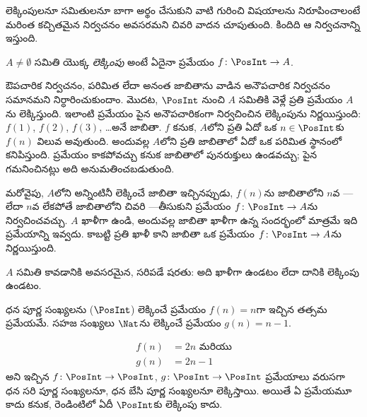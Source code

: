 \documentclass[../../../include/open-logic-section]{subfiles}
\begin{document}
లెక్కింపులనూ  సమితులనూ బాగా అర్థం చేసుకుని వాటి గురించి
విషయాలను నిరూపించాలంటే మరింత కచ్చితమైన నిర్వచనం అవసరమని చివరి వాదన
చూపుతుంది. కిందిది ఆ నిర్వచనాన్ని ఇస్తుంది.

\begin{defn}[లెక్కింపు: ఔపచారికంగా]
$A \neq \emptyset$ సమితి యొక్క \emph{లెక్కింపు} అంటే ఏదైనా
 ప్రమేయం $f \colon \PosInt \to A$.
\end{defn}

\begin{explain}
ఔపచారిక నిర్వచనం, పరిమిత లేదా అనంత జాబితాను వాడిన అనౌపచారిక
నిర్వచనం సమానమని నిర్ధారించుకుందాం. మొదట, $\PosInt$ నుంచి $A$
సమితికి వెళ్లే ప్రతి  ప్రమేయం $A$ను లెక్కిస్తుంది.
ఇలాంటి ప్రమేయం పైన అనౌపచారికంగా నిర్వచించిన లెక్కింపును నిర్ణయిస్తుంది:
$f(1)$, $f(2)$, $f(3)$, \dots అనే జాబితా. $f$  కనుక,
$A$లోని ప్రతి  ఏదో ఒక $n \in \PosInt$కు $f(n)$ విలువ
అవుతుంది. అందువల్ల $A$లోని ప్రతి  జాబితాలో ఏదో ఒక పరిమిత
స్థానంలో కనిపిస్తుంది. ప్రమేయం  కాకపోవచ్చు కనుక జాబితాలో
పునరుక్తులు ఉండవచ్చు; పైన గమనించినట్లు అది అనుమతించబడుతుంది.

మరోవైపు, $A$లోని  అన్నింటినీ లెక్కించే జాబితా ఇచ్చినప్పుడు,
$f(n)$ను జాబితాలోని $n$వ ---లేదా $n$వ  లేకపోతే
జాబితాలోని చివరి ---తీసుకుని  ప్రమేయం
$f\colon \PosInt \to A$ను నిర్వచించవచ్చు. $A$ ఖాళీగా ఉండి, అందువల్ల
జాబితా ఖాళీగా ఉన్న సందర్భంలో మాత్రమే ఇది  ప్రమేయాన్ని
ఇవ్వదు. కాబట్టి ప్రతి ఖాళీ కాని జాబితా ఒక  ప్రమేయం
$f\colon \PosInt \to A$ను నిర్ణయిస్తుంది.
\end{explain}

\begin{defn}
  $A$ సమితి  కావడానికి అవసరమైన, సరిపడే షరతు:
  అది ఖాళీగా ఉండటం లేదా దానికి లెక్కింపు ఉండటం.
\end{defn}

\begin{ex}
ధన పూర్ణ సంఖ్యలను ($\PosInt$) లెక్కించే ప్రమేయం $f(n) = n$గా ఇచ్చిన
తత్సమ ప్రమేయమే. సహజ సంఖ్యలు $\Nat$ను లెక్కించే ప్రమేయం
$g(n) = n - 1$.
\end{ex}

\begin{ex}
\begin{align*}
f(n) & = 2n \text{ మరియు}\\
g(n) & = 2n - 1
\end{align*}
అని ఇచ్చిన $f\colon \PosInt \to \PosInt$, $g \colon \PosInt \to
\PosInt$ ప్రమేయాలు వరుసగా ధన సరి పూర్ణ సంఖ్యలనూ, ధన బేసి పూర్ణ
సంఖ్యలనూ లెక్కిస్తాయి. అయితే ఏ ప్రమేయమూ  కాదు కనుక,
రెండింటిలో ఏదీ $\PosInt$కు లెక్కింపు కాదు.
\end{ex}
\end{document}
